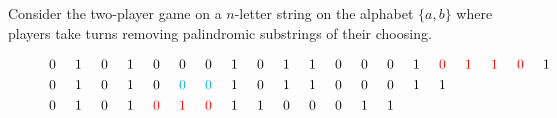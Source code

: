 \documentclass{article}
\begin{document}
Consider the two-player game on a $n$-letter string on the alphabet $\{a,b\}$
where players take turns removing palindromic substrings of their choosing.
\begin{figure}[ht!]
  \begin{align*}
    &0 \hspace{5mm} 1 \hspace{5mm} 0 \hspace{5mm} 1 \hspace{5mm} 0 \hspace{5mm} 0 \hspace{5mm} 0 \hspace{5mm} 1 \hspace{5mm} 0 \hspace{5mm} 1 \hspace{5mm} 1 \hspace{5mm} 0 \hspace{5mm} 0 \hspace{5mm} 0 \hspace{5mm} 1 \hspace{5mm} {\color{red} 0 \hspace{5mm} 1 \hspace{5mm} 1 \hspace{5mm} 0} \hspace{5mm} 1 \\
    &0 \hspace{5mm} 1 \hspace{5mm} 0 \hspace{5mm} 1 \hspace{5mm} 0 \hspace{5mm} {\color{cyan} 0 \hspace{5mm} 0} \hspace{5mm} 1 \hspace{5mm} 0 \hspace{5mm} 1 \hspace{5mm} 1 \hspace{5mm} 0 \hspace{5mm} 0 \hspace{5mm} 0 \hspace{5mm} 1 \hspace{5mm} 1 \\
    &0 \hspace{5mm} 1 \hspace{5mm} 0 \hspace{5mm} 1 \hspace{5mm} {\color{red} 0 \hspace{5mm} 1 \hspace{5mm} 0} \hspace{5mm} 1 \hspace{5mm} 1 \hspace{5mm} 0 \hspace{5mm} 0 \hspace{5mm} 0 \hspace{5mm} 1 \hspace{5mm} 1 \\

\end{align*}
\end{figure}
\end{document}
